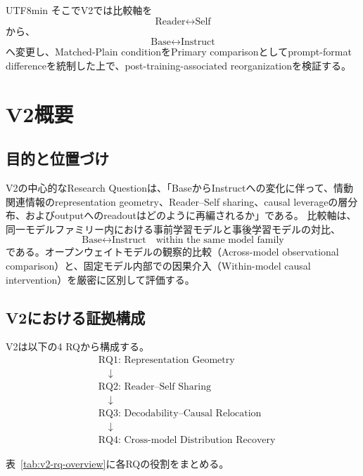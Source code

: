 \documentclass{article} %
\begin{document}
\begin{CJK*}{UTF8}{min}
そこでV2では比較軸を
\[
\text{Reader}\leftrightarrow\text{Self}
\]
から、
\[
\text{Base}\leftrightarrow\text{Instruct}
\]
へ変更し、Matched-Plain conditionをPrimary comparisonとしてprompt-format differenceを統制した上で、post-training-associated reorganizationを検証する。




\section{V2概要}
\label{app:v2-methods}

\subsection{目的と位置づけ}

V2の中心的なResearch Questionは、「BaseからInstructへの変化に伴って、情動関連情報のrepresentation geometry、Reader--Self sharing、causal leverageの層分布、およびoutputへのreadoutはどのように再編されるか」である。
比較軸は、同一モデルファミリー内における事前学習モデルと事後学習モデルの対比、
\[
\text{Base} \leftrightarrow \text{Instruct} \quad \text{within the same model family}
\]
である。オープンウェイトモデルの観察的比較（Across-model observational comparison）と、固定モデル内部での因果介入（Within-model causal intervention）を厳密に区別して評価する。


\subsection{V2における証拠構成}

V2は以下の4 RQから構成する。
\[
\begin{aligned}
&\text{RQ1: Representation Geometry}\\
&\quad\downarrow\\
&\text{RQ2: Reader--Self Sharing}\\
&\quad\downarrow\\
&\text{RQ3: Decodability--Causal Relocation}\\
&\quad\downarrow\\
&\text{RQ4: Cross-model Distribution Recovery}
\end{aligned}
\]

表~\ref{tab:v2-rq-overview}に各RQの役割をまとめる。


\end{CJK*}
\end{document}
